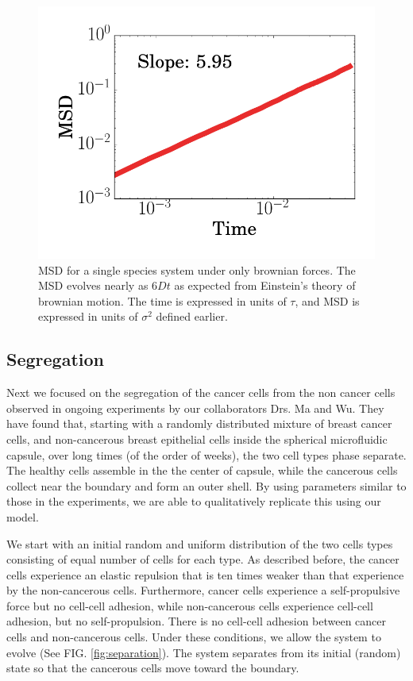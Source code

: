 \documentclass[aps,prb,twocolumn,groupedaddress,nofootinbib,floatfix]{revtex4}
\begin{document}
\begin{figure}
  \includegraphics[width=\columnwidth]{images/brownianMSD.png}
  \caption[brownianMSD]
    {MSD for a single species system under only brownian forces. The MSD evolves nearly as $6Dt$ as expected from Einstein's theory of brownian motion. The time is expressed in units of $\tau$, and MSD is expressed
    in units of $\sigma^2$ defined earlier.}
  \label{fig:brownianMSD}
\end{figure}

\subsection{Segregation}

Next we focused on the segregation of the cancer cells from the non cancer cells
observed in ongoing experiments by our collaborators Drs. Ma and Wu. 
They have found that, starting with a randomly distributed mixture of breast cancer cells,
and non-cancerous breast epithelial cells inside the spherical microfluidic capsule, over long times
(of the order of weeks), the two cell types phase separate. The healthy cells assemble in the the center of capsule,
while the cancerous cells collect near the boundary and form an outer shell. By using parameters similar to those 
in the experiments, we are able to qualitatively replicate this using our model.


We start with an initial random and uniform distribution of the two cells types consisting of  
equal number of cells for each type. As described before, the cancer cells experience an elastic
repulsion that is ten times weaker than that experience by the non-cancerous cells.
Furthermore, cancer cells experience a self-propulsive force but no cell-cell adhesion, while non-cancerous cells experience cell-cell adhesion, but no self-propulsion.
There is no cell-cell adhesion between cancer cells and non-cancerous cells.
Under these conditions, we allow the system to evolve (See FIG. \ref{fig:separation}).
The system separates from its initial (random) state so that the cancerous cells move toward the boundary.
\end{document}
